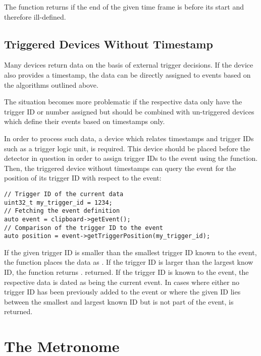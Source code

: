 The function returns  if the end of the given time frame is before its start and therefore ill-defined.

\subsection{Triggered Devices Without Timestamp}
\label{sec:triggered_devices}

Many devices return data on the basis of external trigger decisions.
If the device also provides a timestamp, the data can be directly assigned to events based on the algorithms outlined above.

The situation becomes more problematic if the respective data only have the trigger ID or number assigned but should be combined with un-triggered devices which define their events based on timestamps only.


In order to process such data, a device which relates timestamps and trigger IDs such as a trigger logic unit, is required.
This device should be placed before the detector in question in order to assign trigger IDs to the event using the  function.
Then, the triggered device without timestamps can query the event for the position of its trigger ID with respect to the event:

\begin{verbatim}
// Trigger ID of the current data
uint32_t my_trigger_id = 1234;
// Fetching the event definition
auto event = clipboard->getEvent();
// Comparison of the trigger ID to the event
auto position = event->getTriggerPosition(my_trigger_id);
\end{verbatim}

If the given trigger ID is smaller than the smallest trigger ID known to the event, the function places the data as .
If the trigger ID is larger than the largest know ID, the function returns . returned. If the trigger ID is known to the event, the respective data is dated as being  the current event.
In cases where either no trigger ID has been previously added to the event or where the given ID lies between the smallest and largest known ID but is not part of the event,  is returned.

\section{The Metronome}
\label{sec:metronome}

